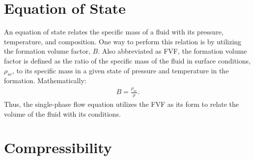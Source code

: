 \section{Equation of State}

An equation of state relates the specific mass of a fluid with its pressure, temperature, and composition.
%
One way to perform this relation is by utilizing the formation volume factor, $B$.
%
Also abbreviated as FVF, the formation volume factor is defined as the ratio of the specific mass of the fluid in surface conditions, $\rho_{sc}$, to its specific mass in a given state of pressure and temperature in the formation.
%
Mathematically:
%
%
\begin{align}
	\label{equation-fvf}
	B=\frac{\rho_{sc}}{\rho}.
\end{align}
Thus, the single-phase flow equation utilizes the FVF as its form to relate the volume of the fluid with its conditions.

\section{Compressibility}

